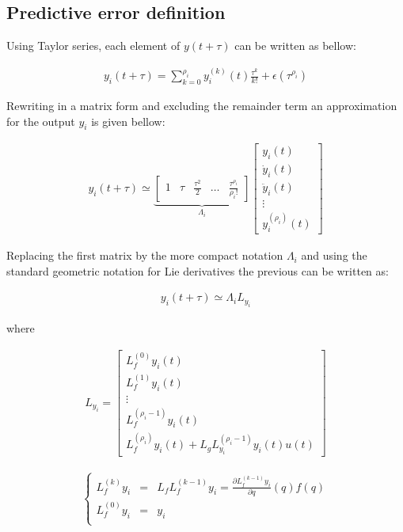 \documentclass[letterpaper, 10 pt, conference]{ieeeconf}  %
\begin{document}
\subsection{Predictive error definition}

Using Taylor series, each element of ${y(t+\tau)}$ can be written as bellow:

\begin{align*}
y_i(t+\tau) = \sum_{k=0}^{\rho_i} 
y^{(k)}_i(t)\frac{\tau^k}{k!} + \epsilon(\tau^{\rho_i})
\end{align*}

Rewriting in a matrix form and excluding the remainder term an approximation for the output $y_i$ is given bellow:

\begin{eqnarray}
y_i(t+\tau) \simeq \underbrace{\left[\begin{array}{ccccc}
1 & \tau & \frac{\tau^2}{2} & \dots & \frac{\tau^{\rho_i}}{{\rho_i}!}
\end{array}\right]}_{\Lambda_i}
\left[\begin{array}{c}
y_i(t)\\
\dot{y}_i(t)\\
\ddot{y}_i(t)\\
\vdots\\
y^{(\rho_i)}_i(t)
\end{array}\right]
\end{eqnarray}

Replacing the first matrix by the more compact notation $\Lambda_i$ and using the standard geometric notation for Lie derivatives the previous can be written as:

\begin{eqnarray}
y_i(t+\tau) \simeq \Lambda_i L_{y_i}
\end{eqnarray}

where

\begin{eqnarray*}
L_{y_i} = \left[\begin{array}{c}
L_f^{(0)}y_i(t)\\
L_f^{(1)}y_i(t)\\
\vdots\\
L^{({\rho_i}-1)}_fy_i(t)\\
L^{({\rho_i})}_fy_i(t)+L_gL_{y_i}^{({\rho_i}-1)}y_i(t)u(t)
\end{array}\right]
\end{eqnarray*}


\begin{eqnarray*}
\left\lbrace\begin{array}{lcl}
L_f^{(k)} y_i & = & L_fL_f^{(k-1)}y_i = \frac{\partial L_f^{(k-1)}y_i}{\partial q}(q)f(q)\\
L_f^{(0)}y_i & = & y_i\\
\end{array}\right.
\end{eqnarray*}
\end{document}
